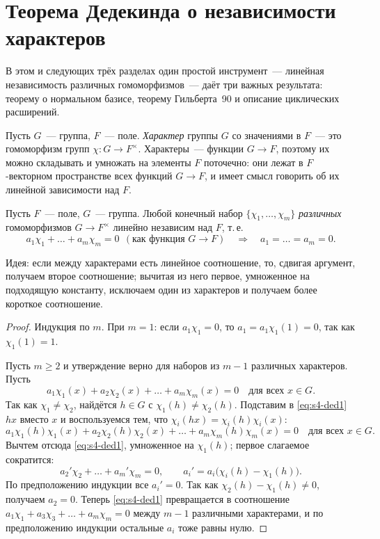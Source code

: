 \section{Теорема Дедекинда о независимости характеров}

В этом и следующих трёх разделах один простой инструмент~--- линейная независимость различных гомоморфизмов~---
даёт три важных результата: теорему о нормальном базисе, теорему Гильберта~90 и описание циклических расширений.

\begin{definition}
Пусть $G$~--- группа, $F$~--- поле. \emph{Характер} группы $G$ со значениями в $F$~--- это гомоморфизм групп
$\chi\colon G\to F^\times$. Характеры~--- функции $G\to F$, поэтому их можно складывать и умножать на элементы $F$
поточечно: они лежат в $F$-векторном пространстве всех функций $G\to F$, и имеет смысл говорить об их линейной
зависимости над $F$.
\end{definition}

\begin{theorem}[5.14: Дедекинд]
Пусть $F$~--- поле, $G$~--- группа. Любой конечный набор $\{\chi_1,\dots,\chi_m\}$ \emph{различных} гомоморфизмов
$G\to F^\times$ линейно независим над $F$, т.\,е.
\[
a_1\chi_1+\dots+a_m\chi_m=0\ \ (\text{как функция } G\to F)\quad\Longrightarrow\quad a_1=\dots=a_m=0.
\]
\end{theorem}

Идея: если между характерами есть линейное соотношение, то, сдвигая аргумент, получаем второе соотношение; вычитая
из него первое, умноженное на подходящую константу, исключаем один из характеров и получаем более короткое соотношение.

\begin{proof}
Индукция по $m$. При $m=1$: если $a_1\chi_1=0$, то $a_1=a_1\chi_1(1)=0$, так как $\chi_1(1)=1$.

Пусть $m\ge2$ и утверждение верно для наборов из $m-1$ различных характеров. Пусть
\begin{equation}\label{eq:s4-ded1}
a_1\chi_1(x)+a_2\chi_2(x)+\dots+a_m\chi_m(x)=0\quad\text{для всех } x\in G.
\end{equation}
Так как $\chi_1\ne\chi_2$, найдётся $h\in G$ с $\chi_1(h)\ne\chi_2(h)$. Подставим в \eqref{eq:s4-ded1} $hx$ вместо $x$ и
воспользуемся тем, что $\chi_i(hx)=\chi_i(h)\chi_i(x)$:
\[
a_1\chi_1(h)\chi_1(x)+a_2\chi_2(h)\chi_2(x)+\dots+a_m\chi_m(h)\chi_m(x)=0\quad\text{для всех } x\in G.
\]
Вычтем отсюда \eqref{eq:s4-ded1}, умноженное на $\chi_1(h)$; первое слагаемое сократится:
\[
a_2'\chi_2+\dots+a_m'\chi_m=0,\qquad a_i'=a_i\bigl(\chi_i(h)-\chi_1(h)\bigr).
\]
По предположению индукции все $a_i'=0$. Так как $\chi_2(h)-\chi_1(h)\ne0$, получаем $a_2=0$. Теперь \eqref{eq:s4-ded1}
превращается в соотношение $a_1\chi_1+a_3\chi_3+\dots+a_m\chi_m=0$ между $m-1$ различными характерами, и по
предположению индукции остальные $a_i$ тоже равны нулю.
\end{proof}

